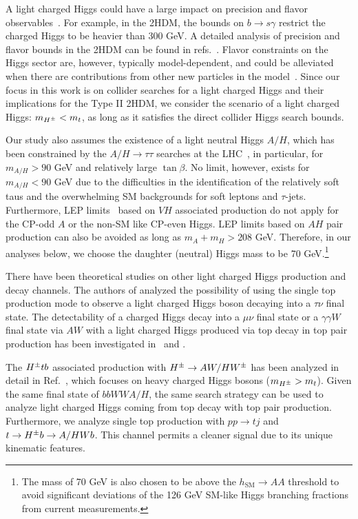  A light charged Higgs could have a large impact on precision and flavor observables~\cite{Olive2016}. For example, in  the 2HDM, the bounds on $b\to s\gamma$ restrict the charged Higgs to be heavier  than 300 GeV. A detailed analysis of precision and flavor bounds in the 2HDM can be found in refs.~\cite{Coleppa:2013dya,Mahmoudi:2009zx}. Flavor constraints on the Higgs sector are, however, typically   model-dependent, and could be alleviated when there are contributions from other new particles in the model~\cite{Han:2013mga}.   Since our focus in this work is   on collider searches for a light  charged Higgs and their implications for the Type II 2HDM, we consider  the scenario of a light charged Higgs: $m_{H^{\pm}}<m_t$, as long as it satisfies the direct collider Higgs search bounds.

 Our study also assumes the existence of a light neutral Higgs $A/H$, which has been constrained by the $A/H \rightarrow \tau\tau$ searches at the LHC~\cite{Khachatryan:2014wca,Aad:2014vgg}, in particular, for $m_{A/H}>90$ GeV and relatively large $\tan\beta$.  No limit, however, exists for $m_{A/H}<90$ GeV due to the difficulties in the identification of the relatively soft  taus  and the overwhelming SM backgrounds for  soft leptons and $\tau$-jets.   Furthermore, LEP limits~\cite{LEP_Higgs} based on $VH$ associated production do not apply for the CP-odd $A$ or the non-SM like CP-even Higgs.  LEP limits based on $AH$ pair production can also be avoided as long as $m_A+m_H>208$ GeV.  Therefore, in our analyses below, we choose the daughter (neutral) Higgs mass to be 70 GeV.\footnote{The mass of 70 GeV is also chosen to be above the $h_\text{SM} \to AA$ threshold to avoid significant deviations of the 126 GeV SM-like Higgs branching fractions from current measurements.}

There have been theoretical studies on other light charged Higgs production and decay channels. The authors of  \cite{Guedes:2012eu,Hashemi:2013kga} analyzed the possibility of using the single top production mode to observe a light charged Higgs boson decaying into a $\tau\nu$ final state. The detectability of a charged Higgs decay into a $ \mu \nu $ final state  or  a $\gamma\gamma W$ final state via $AW$  with a light charged Higgs produced via top decay in top pair production has been investigated in~\cite{Hashemi:2011gy} and  \cite{Das:2014fha}. 

The $H^{\pm}  tb$ associated production with $H^{\pm}\to AW/HW^{\pm} $ has been analyzed in detail in Ref.~\cite{Coleppa:2014cca},  which focuses on heavy charged Higgs bosons ($m_{H^{\pm}}>m_t$).  Given the same final state of $bbWWA/H$, the same search strategy can be used to analyze light charged Higgs coming from top decay with top pair production.   Furthermore, we analyze single top production with $pp \to tj$ and $t \to H^{\pm} b  \to A/HWb $.   This channel permits a cleaner signal due to its unique kinematic features. 



